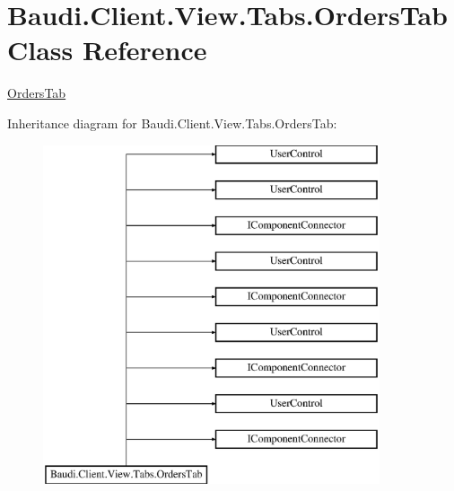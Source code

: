 \hypertarget{class_baudi_1_1_client_1_1_view_1_1_tabs_1_1_orders_tab}{}\section{Baudi.\+Client.\+View.\+Tabs.\+Orders\+Tab Class Reference}
\label{class_baudi_1_1_client_1_1_view_1_1_tabs_1_1_orders_tab}


\hyperlink{class_baudi_1_1_client_1_1_view_1_1_tabs_1_1_orders_tab}{Orders\+Tab}  


Inheritance diagram for Baudi.\+Client.\+View.\+Tabs.\+Orders\+Tab\+:\begin{figure}[H]
\begin{center}
\leavevmode
\includegraphics[height=10.000000cm]{class_baudi_1_1_client_1_1_view_1_1_tabs_1_1_orders_tab}
\end{center}
\end{figure}
